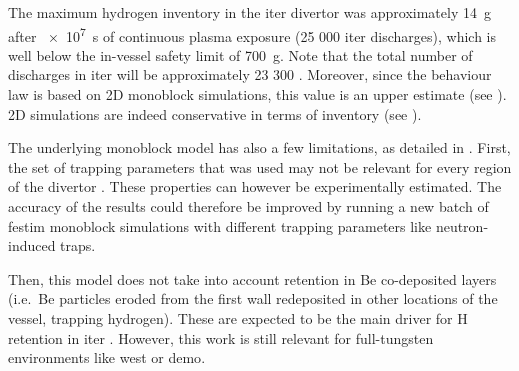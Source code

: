 The maximum hydrogen \gls{inventory} in the \gls{iter} \gls{divertor} was approximately \SI{14}{g} after \SI{e7}{s} of continuous plasma exposure (25 000 \gls{iter} discharges), which is well below the in-vessel safety limit of \SI{700}{g}.
Note that the total number of discharges in \gls{iter} will be approximately 23 300 \cite{pitts_physics_2019}.
Moreover, since the behaviour law is based on 2D \gls{monoblock} simulations, this value is an upper estimate (see ).
2D simulations are indeed conservative in terms of \gls{inventory} (see ).

The underlying \gls{monoblock} model has also a few limitations, as detailed in .
First, the set of trapping parameters that was used may not be relevant for every region of the \gls{divertor} .
These properties can however be experimentally estimated.
The accuracy of the results could therefore be improved by running a new batch of \gls{festim} \gls{monoblock} simulations with different trapping parameters like neutron-induced traps.

Then, this model does not take into account \gls{retention} in \gls{Be} co-deposited layers (i.e.\ \gls{Be} particles eroded from the \gls{first wall} redeposited in other locations of the vessel, trapping hydrogen).
These are expected to be the main driver for \gls{H} \gls{retention} in \gls{iter} .
However, this work is still relevant for full-tungsten environments like \gls{west} or \gls{demo}.
